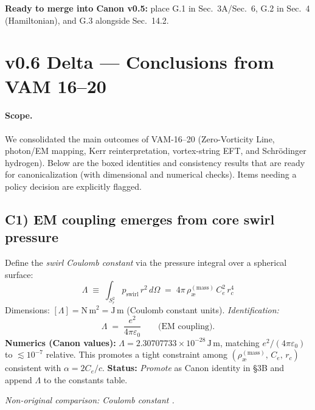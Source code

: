 \documentclass[11pt]{article}
\begin{document}
    \textbf{Ready to merge into Canon v0.5:} place G.1 in Sec.~3A/Sec.~6, G.2 in Sec.~4 (Hamiltonian), and G.3 alongside Sec.~14.2.


    \section*{v0.6 Delta — Conclusions from VAM 16–20}
    \label{sec:v06-delta}

    \paragraph{Scope.}
    We consolidated the main outcomes of VAM-16–20 (Zero-Vorticity Line, photon/EM mapping, Kerr reinterpretation, vortex-string EFT, and Schr\"odinger hydrogen). Below are the boxed identities and consistency results that are ready for canonicalization (with dimensional and numerical checks). Items needing a policy decision are explicitly flagged.

    \subsection*{C1) EM coupling emerges from core swirl pressure}
    \label{subsec:coulomb-from-swirl}

    Define the \emph{swirl Coulomb constant} via the pressure integral over a spherical surface:
    \[
        \boxed{ \Lambda \;\equiv\; \int_{S_r^2} p_{\text{swirl}}\,r^2\,d\Omega
        \;=\; 4\pi\,\rho_{\text{\ae}}^{(\text{mass})}\,C_e^2\,r_c^4 }
    \]
    Dimensions: $[\Lambda]=\mathrm{N\,m^2}=\mathrm{J\,m}$ (Coulomb constant units).
    \emph{Identification:}
    \[
        \boxed{ \Lambda \;=\; \frac{e^2}{4\pi\varepsilon_0} } \qquad \text{(EM coupling).}
    \]
    \textbf{Numerics (Canon values):} $\Lambda=2.30707733\times10^{-28}\,\mathrm{J\,m}$, matching $e^2/(4\pi\varepsilon_0)$ to $\lesssim10^{-7}$ relative.
    This promotes a tight constraint among $(\rho_{\text{\ae}}^{(\text{mass})},\,C_e,\,r_c)$ consistent with $\alpha = 2C_e/c$.
    \textbf{Status:} \emph{Promote} as Canon identity in \S3B and append $\Lambda$ to the constants table.

    \textit{Non-original comparison: Coulomb constant \cite{Jackson1999}.}



\end{document}
